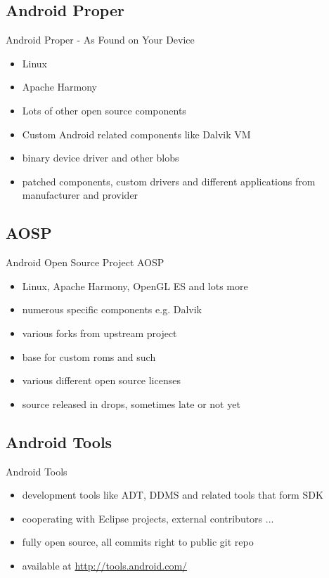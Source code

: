 \documentclass[aspectratio=169]{beamer}
\newcommand{\surl}[1] {{\tiny \url{#1}}}
\begin{document}
  \subsection{Android Proper}
    \begin{frame}{Android Proper - As Found on Your Device}
      \begin{itemize}
        \item Linux
        \item Apache Harmony
        \item Lots of other open source components
        \item Custom Android related components like Dalvik VM
        \item binary device driver and other blobs
        \item patched components, custom drivers and different applications from manufacturer and provider
      \end{itemize}
    \end{frame}
  
  \subsection{AOSP}
    \begin{frame}{Android Open Source Project AOSP}
      \begin{itemize}
        \item Linux, Apache Harmony, OpenGL ES and lots more
        \item numerous specific components e.g. Dalvik
        \item various forks from upstream project
        \item base for custom roms and such
        \item various different open source licenses
        \item source released in drops, sometimes late or not yet
      \end{itemize}
    \end{frame}

  \subsection{Android Tools}
    \begin{frame}{Android Tools}
      \begin{itemize}
        \item development tools like ADT, DDMS and related tools that form SDK
        \item cooperating with Eclipse projects, external contributors ...
        \item fully open source, all commits right to public git repo
        \item available at \surl{http://tools.android.com/}
      \end{itemize}
    \end{frame}
\end{document}
